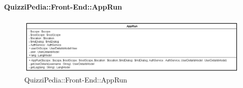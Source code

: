 
	
		
		\paragraph{QuizziPedia::Front-End::AppRun}
		
		\label{QuizziPedia::Front-End::AppRun}
		
		\begin{figure}[ht]
			\centering
			\includegraphics[scale=0.5,keepaspectratio]{UML/Classi/Front-End/QuizziPedia_Front-end_AppRun.png}
			\caption{QuizziPedia::Front-End::AppRun}
		\end{figure} \FloatBarrier
		
